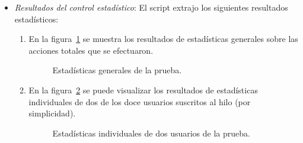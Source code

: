 \documentclass[a4paper, 12pt]{book}
\begin{document}
\begin{itemize}
	\item \textit{Resultados del control estad\'istico}: El script extrajo los siguientes resultados estad\'isticos:
	\begin{enumerate}
		\item En la figura~\ref{figura:estadgener} se muestra los resultados de estad\'isticas generales sobre las acciones totales que se 
		efectuaron.
		\begin{figure}[htbp] 
		  \centering
		  \caption{Estad\'isticas generales de la prueba.}
		  \label{figura:estadgener}
		\end{figure}
		\item En la figura~\ref{figura:estadindiv} se puede visualizar los resultados de estad\'isticas individuales de dos de los doce usuarios 
		suscritos al hilo (por simplicidad).
		\begin{figure}[htbp] 
		  \centering
		  \caption{Estad\'isticas individuales de dos usuarios de la prueba.}
		  \label{figura:estadindiv}
		\end{figure}
	\end{enumerate}
\end{itemize}
\end{document}
